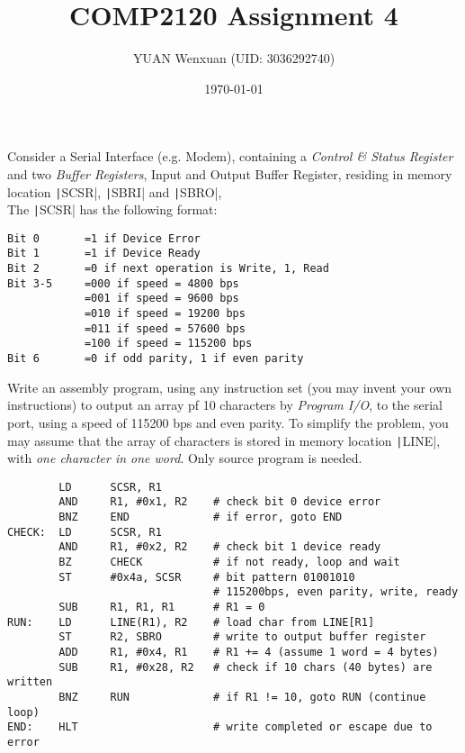 \documentclass[answers]{exam}
\title{COMP2120 Assignment 4}
\author{YUAN Wenxuan (UID: 3036292740)}
\date{\today}
\begin{document}
\maketitle
\begin{questions}

    \question Consider a Serial Interface (e.g. Modem),
    containing a \textit{Control \& Status Register} and two \textit{Buffer Registers}, Input and Output Buffer Register,
    residing in memory location \texttt|SCSR|, \texttt|SBRI| and \texttt|SBRO|, \\
    The \texttt|SCSR| has the following format:

    \begin{verbatim}
Bit 0       =1 if Device Error
Bit 1       =1 if Device Ready
Bit 2       =0 if next operation is Write, 1, Read
Bit 3-5     =000 if speed = 4800 bps
            =001 if speed = 9600 bps
            =010 if speed = 19200 bps
            =011 if speed = 57600 bps
            =100 if speed = 115200 bps
Bit 6       =0 if odd parity, 1 if even parity
    \end{verbatim}

    Write an assembly program, using any instruction set (you may invent your own instructions) to output an array pf 10 characters by \textit{Program I/O}, to the serial port, using a speed of 115200 bps and even parity.
    To simplify the problem, you may assume that the array of characters is stored in memory location \texttt|LINE|, with \textit{one character in one word}.
    Only source program is needed.

    \begin{solution}
        \begin{verbatim}
        LD      SCSR, R1
        AND     R1, #0x1, R2    # check bit 0 device error
        BNZ     END             # if error, goto END
CHECK:  LD      SCSR, R1
        AND     R1, #0x2, R2    # check bit 1 device ready
        BZ      CHECK           # if not ready, loop and wait
        ST      #0x4a, SCSR     # bit pattern 01001010
                                # 115200bps, even parity, write, ready
        SUB     R1, R1, R1      # R1 = 0
RUN:    LD      LINE(R1), R2    # load char from LINE[R1]
        ST      R2, SBRO        # write to output buffer register
        ADD     R1, #0x4, R1    # R1 += 4 (assume 1 word = 4 bytes)
        SUB     R1, #0x28, R2   # check if 10 chars (40 bytes) are written
        BNZ     RUN             # if R1 != 10, goto RUN (continue loop)
END:    HLT                     # write completed or escape due to error
        \end{verbatim}
    \end{solution}


\end{questions}
\end{document}
